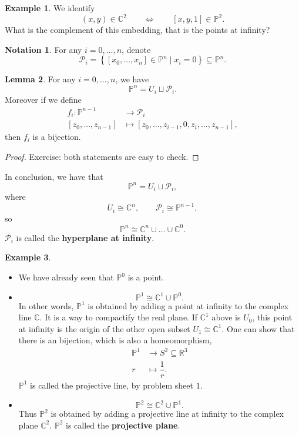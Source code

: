 \documentclass{article}
\newcommand{\R}{\mathbb{R}}
\newcommand{\C}{\mathbb{C}}
\renewcommand{\P}{\mathbb{P}}
\newcommand{\rb}[1]{\left( #1 \right)}
\renewcommand{\sb}[1]{\left[ #1 \right]}
\newcommand{\cb}[1]{\left\{ #1 \right\}}
\theoremstyle{definition}\newtheorem{definition}{Definition}[section]
\theoremstyle{definition}\newtheorem{notation}[definition]{Notation}
\theoremstyle{definition}\newtheorem{remark}[definition]{Remark}
\theoremstyle{definition}\newtheorem{example1}[definition]{Example}
\theoremstyle{definition}\newtheorem{fact}{Fact}
\theoremstyle{definition}\newtheorem{exercise}{Exercise}
\theoremstyle{definition}\newtheorem*{example2}{Example}
\newtheorem{lemma}[definition]{Lemma}
\begin{document}
\begin{example2}
We identify
$$ \rb{x, y} \in \C^2 \qquad \iff \qquad \sb{x, y, 1} \in \P^2. $$
What is the complement of this embedding, that is the points at infinity?
\end{example2}

\begin{notation}
For any $ i = 0, \dots, n $, denote
$$ \mathcal{P}_i = \cb{\sb{x_0, \dots, x_n} \in \P^n \mid x_i = 0} \subseteq \P^n. $$
\end{notation}

\begin{lemma}
\label{lem:3.13}
For any $ i = 0, \dots, n $, we have
$$ \P^n = U_i \sqcup \mathcal{P}_i. $$
Moreover if we define
\begin{align*}
f_i : \P^{n - 1} & \to \mathcal{P}_i \\
\sb{z_0, \dots, z_{n - 1}} & \mapsto \sb{z_0, \dots, z_{i - 1}, 0, z_i, \dots, z_{n - 1}},
\end{align*}
then $ f_i $ is a bijection.
\end{lemma}

\begin{proof}
Exercise: both statements are easy to check.
\end{proof}

In conclusion, we have that
$$ \P^n = U_i \sqcup \mathcal{P}_i, $$
where
$$ U_i \cong \C^n, \qquad \mathcal{P}_i \cong \P^{n - 1}, $$
so
$$ \P^n \cong \C^n \cup \dots \cup \C^0. $$
$ \mathcal{P}_i $ is called the \textbf{hyperplane at infinity}.

\begin{example1}
\hfill
\begin{itemize}
\item We have already seen that $ \P^0 $ is a point.
\item
$$ \P^1 \cong \C^1 \cup \P^0. $$
In other words, $ \P^1 $ is obtained by adding a point at infinity to the complex line $ \C $. It is a way to compactify the real plane. If $ \C^1 $ above is $ U_0 $, this point at infinity is the origin of the other open subset $ U_1 \cong \C^1 $. One can show that there is an bijection, which is also a homeomorphism,
\begin{align*}
\P^1 & \to S^2 \subseteq \R^3 \\
r & \mapsto \dfrac{1}{r}.
\end{align*}
$ \P^1 $ is called the projective line, by problem sheet $ 1 $.
\item
$$ \P^2 \cong \C^2 \cup \P^1. $$
Thus $ \P^2 $ is obtained by adding a projective line at infinity to the complex plane $ \C^2 $. $ \P^2 $ is called the \textbf{projective plane}.
\end{itemize}
\end{example1}
\end{document}
